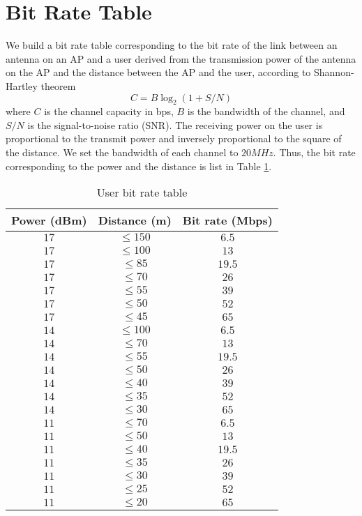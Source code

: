 \section{Bit Rate Table}
	We build a bit rate table corresponding to the bit rate of the link between an antenna on an AP and a user derived from the transmission power of the antenna on the AP and the distance between the AP and the user, according to Shannon-Hartley theorem
	$$ C=B\log_2(1+S/N) $$
	where $C$ is the channel capacity in bps, $B$ is the bandwidth of the channel, and $S/N$ is the signal-to-noise ratio (SNR). The receiving power on the user is proportional to the transmit power and inversely proportional to the square of the distance. We set the bandwidth of each channel to $20 MHz$. Thus, the bit rate corresponding to the power and the distance is list in Table \ref{Tab:drol}.

	\begin{table} \small
		\centering \caption{User bit rate table}
		\renewcommand\arraystretch{1.0}
		\begin{tabular}{|c|c|c|} %
			\hline	Power (dBm) & Distance (m) & Bit rate (Mbps) \\
			\hline	$17$ & $\le 150$ & $6.5$ \\
			\hline	$17$ & $\le 100$ & $13$ \\		
			\hline	$17$ & $\le 85$ & $19.5$ \\
			\hline	$17$ & $\le 70$ & $26$ \\
			\hline	$17$ & $\le 55$ & $39$ \\
			\hline	$17$ & $\le 50$ & $52$ \\
			\hline	$17$ & $\le 45$ & $65$ \\
			\hline	$14$ & $\le 100$ & $6.5$ \\
			\hline	$14$ & $\le 70$ & $13$ \\
			\hline	$14$ & $\le 55$ & $19.5$ \\
			\hline	$14$ & $\le 50$ & $26$ \\
			\hline	$14$ & $\le 40$ & $39$ \\
			\hline	$14$ & $\le 35$ & $52$ \\
			\hline	$14$ & $\le 30$ & $65$ \\
			\hline	$11$ & $\le 70$ & $6.5$ \\
			\hline	$11$ & $\le 50$ & $13$ \\
			\hline	$11$ & $\le 40$ & $19.5$ \\
			\hline	$11$ & $\le 35$ & $26$ \\
			\hline	$11$ & $\le 30$ & $39$ \\
			\hline	$11$ & $\le 25$ & $52$ \\
			\hline	$11$ & $\le 20$ & $65$ \\
			\hline
		\end{tabular}\label{Tab:drol}
	\end{table}
